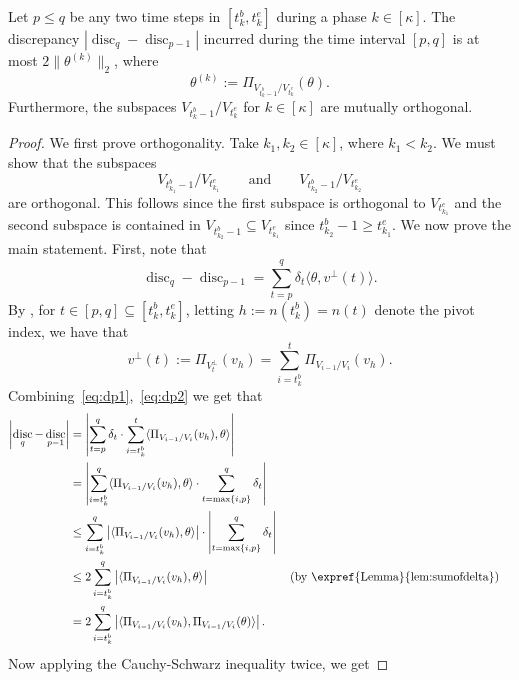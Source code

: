 \documentclass{toc}
\DeclareMathOperator{\disc}{disc}   %
\newcommand{\set}[1]{\left\{ #1 \right\}}
\newcommand{\ip}[2]{\langle #1, #2 \rangle}
\begin{document}
\begin{lemma}
\label{lem:discphase}
Let $p \le q$ be any two time steps in $[t^b_k, t^e_k]$ during a phase $k \in [\kappa]$.
The discrepancy
$|\disc_{q}-\disc_{p-1}|$ incurred during the time interval $[p,q]$ is
at most $2 \|\theta^{(k)}\|_2$, where
\[
  \theta^{(k)} := \Pi_{V_{t^b_k-1} / V_{t^e_k}}(\theta).
\]
Furthermore, the subspaces $V_{t^b_k-1} / V_{t^e_k}$ for
$k \in [\kappa]$ are mutually orthogonal.
\end{lemma}
\begin{proof}
We first prove orthogonality. Take $k_1,k_2 \in [\kappa]$, where $k_1 < k_2$. We
must show that the subspaces
\[
  V_{t^b_{k_1}-1} / V_{t^e_{k_1}}\qquad \text{and}\qquad V_{t^b_{k_2}-1} /
  V_{t^e_{k_2}}
\]
are orthogonal. This follows since the first subspace is orthogonal to
$V_{t^e_{k_1}}$ and the second subspace is contained in
$V_{t^b_{k_2}-1} \subseteq V_{t^e_{k_1}}$ since
$t^b_{k_2}-1 \geq t^e_{k_1}$. We now prove the main statement. First,
note that
\begin{equation}
\label{eq:dp1}
\disc_{q}-\disc_{p-1} = \sum_{t=p}^{q} \delta_t \ip{\theta}{v^\perp(t)}\text {.}
\end{equation}
By , for $t \in [p,q] \subseteq
[t^b_k,t^e_k]$, letting $h := n(t^b_k) = n(t)$ denote the pivot index, we have that
\begin{equation}
\label{eq:dp2}
v^\perp(t) := \Pi_{V_t^\perp}(v_h) = \sum_{i=t^b_k}^{t} \Pi_{V_{i-1}/V_i}(v_h).
\end{equation}
Combining~\eqref{eq:dp1},~\eqref{eq:dp2} we get that
\begin{align}
\left|\disc_{q}-\disc_{p-1}\right| &= \left|\sum_{t=p}^{q} \delta_t \cdot
\sum_{i=t^b_k}^t \ip{\Pi_{V_{i-1}/V_i}(v_h)}{\theta}\right| \nonumber\\
   &= \left|\sum_{i=t^b_k}^{q} \ip{\Pi_{V_{i-1}/V_i}(v_h)}{\theta} \cdot \sum_{t= \max \set{i,p}}^{q} \delta_t
\right| \nonumber\\
   &\leq \sum_{i=t^b_k}^{q} \left|\ip{\Pi_{V_{i-1}/V_i}(v_h)}{\theta}\right| \cdot \left|\sum_{t= \max \set{i,p}}^{q} \delta_t\right| \nonumber
 \\
   &\leq  2 \sum_{i=t^b_k}^{q} \left|\ip{\Pi_{V_{i-1}/V_i}(v_h)}{\theta}\right| &&
\left(\text{by \expref{Lemma}{lem:sumofdelta}}\right)\nonumber \\
   &= 2 \sum_{i=t^b_k}^{q} \left|\ip{\Pi_{V_{i-1}/V_i}(v_h)}{\Pi_{V_{i-1}/V_i}(\theta)}\right|. \label{eq:dp3}
\end{align}
Now applying the Cauchy-Schwarz inequality twice, we get

\end{proof}
\end{document}
